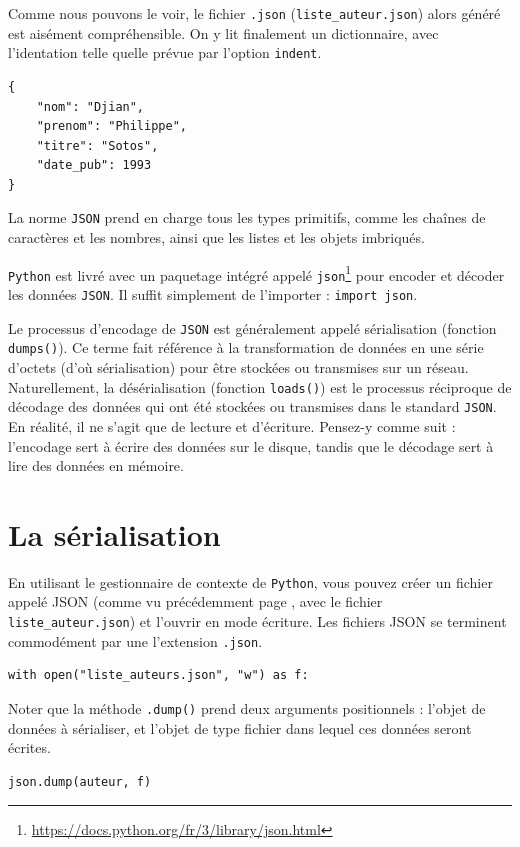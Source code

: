 \documentclass[a4paper,11pt]{book}
\begin{document}
Comme nous pouvons le voir, le fichier \texttt{.json} (\texttt{liste\_auteur.json}) alors généré est aisément compréhensible. On y lit  finalement un dictionnaire, avec l'identation telle quelle prévue par l'option \texttt{indent}.
\begin{lstlisting}[caption=Contenu d'un fichier \texttt{.json}]
{
    "nom": "Djian",
    "prenom": "Philippe",
    "titre": "Sotos",
    "date_pub": 1993
}
\end{lstlisting}
\medskip

La norme \texttt{JSON} prend en charge tous les types primitifs, comme les chaînes de caractères et les nombres, ainsi que les listes et les objets imbriqués.
\medskip

\texttt{Python} est livré avec un paquetage intégré appelé \texttt{json}\footnote{\url{https://docs.python.org/fr/3/library/json.html}} pour encoder et décoder les données \texttt{JSON}. Il suffit simplement de l'importer : \texttt{import json}.
\medskip

Le processus d'encodage de \texttt{JSON} est généralement appelé sérialisation (fonction \texttt{dumps()}). Ce terme fait référence à la transformation de données en une série d'octets (d'où sérialisation) pour être stockées ou transmises sur un réseau. Naturellement, la désérialisation (fonction \texttt{loads()}) est le processus réciproque de décodage des données qui ont été stockées ou transmises dans le standard \texttt{JSON}. En réalité, il ne s'agit que de lecture et d'écriture. Pensez-y comme suit : l'encodage sert à écrire des données sur le disque, tandis que le décodage sert à lire des données en mémoire.
\medskip

\section{La sérialisation}
En utilisant le gestionnaire de contexte de \texttt{Python}, vous pouvez créer un fichier appelé JSON (comme vu précédemment page \pageref{serialistionJSON}, avec le fichier \texttt{liste\_auteur.json}) et l'ouvrir en mode écriture. Les fichiers JSON se terminent commodément par une l'extension \texttt{.json}.
\begin{lstlisting}[caption=Créer un fichier \texttt{.json}]
with open("liste_auteurs.json", "w") as f:
\end{lstlisting}
\medskip

Noter que la méthode \texttt{.dump()} prend deux arguments positionnels : l'objet de données à sérialiser, et l'objet de type fichier dans lequel ces données seront écrites.
\begin{lstlisting}[caption=Ecriture des données]
	json.dump(auteur, f)
\end{lstlisting}
\medskip
\end{document}
